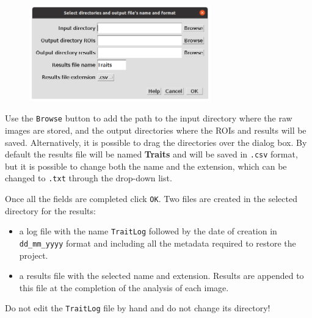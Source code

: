 \documentclass[
  letterpaper,
  DIV=11,
  numbers=noendperiod,
  oneside]{scrreprt}
\providecommand{\tightlist}{%
  \setlength{\itemsep}{0pt}\setlength{\parskip}{0pt}}\usepackage{longtable,booktabs,array}
\begin{document}
\begin{figure}

{\centering \includegraphics[width=0.7\textwidth,height=\textheight]{./images/screenshots/dialog_select_directories.png}

}

\end{figure}

Use the \texttt{Browse} button to add the path to the input directory
where the raw images are stored, and the output directories where the
ROIs and results will be saved. Alternatively, it is possible to drag
the directories over the dialog box. By default the results file will be
named \textbf{Traits} and will be saved in \texttt{.csv} format, but it
is possible to change both the name and the extension, which can be
changed to \texttt{.txt} through the drop-down list.

Once all the fields are completed click \texttt{OK}. Two files are
created in the selected directory for the results:

\begin{itemize}
\tightlist
\item
  a log file with the name \texttt{TraitLog} followed by the date of
  creation in \texttt{dd\_mm\_yyyy} format and including all the
  metadata required to restore the project.
\item
  a results file with the selected name and extension. Results are
  appended to this file at the completion of the analysis of each image.
\end{itemize}

\begin{tcolorbox}[standard jigsaw,arc=.35mm, toptitle=1mm, titlerule=0mm, bottomtitle=1mm, left=2mm, colbacktitle=quarto-callout-important-color!10!white, colback=white, opacityback=0, leftrule=.75mm, title=\textcolor{quarto-callout-important-color}{\faExclamation}\hspace{0.5em}{Important}, coltitle=black, rightrule=.15mm, bottomrule=.15mm, toprule=.15mm, opacitybacktitle=0.6, colframe=quarto-callout-important-color-frame]
Do not edit the \texttt{TraitLog} file by hand and do not change its
directory!
\end{tcolorbox}
\end{document}
